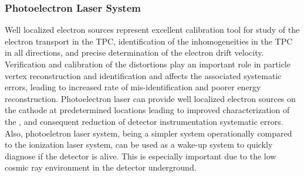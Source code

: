 \subsubsection{Photoelectron Laser System}
\label{sec:sp-calib-sys-las-pe}



\label{sec:sp-calib-sys-las-pe-phys} 

Well localized electron sources represent excellent calibration tool for study of the electron transport in the  TPC, identification of the inhomogeneities in the TPC \efield in all directions, and precise determination of the electron drift velocity. Verification and calibration of the \efield distortions play an important role in particle vertex reconstruction and identification and affects the associated systematic errors, leading to increased rate of mis-identification and poorer energy reconstruction. Photoelectron laser can provide well localized electron sources on the cathode at predetermined locations leading to improved characterization of the \efield, and consequent reduction of detector instrumentation systematic errors. Also, photoeletron laser system, being a simpler system operationally compared to the ionization laser system, can be used as a wake-up system to quickly diagnose if the detector is alive. This is especially important due to the low cosmic ray environment in the detector underground. 

\label{sec:sp-calib-sys-las-pe-des}

